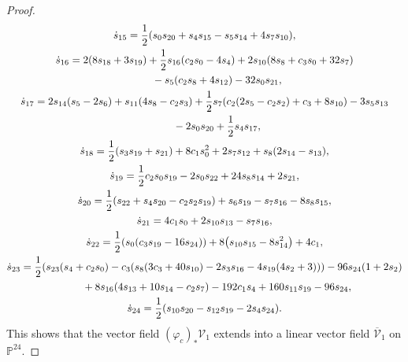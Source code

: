 \documentclass[10pt,a4paper]{amsart}
\numberwithin{equation}{section}
\begin{document}
\begin{proof}
\begin{gather*}
 \dot{s}_{15}= \frac{1}{2}(s_0s_{20}+s_4s_{15}-s_5s_{14}+4s_7s_{10}), \\
 \dot{s}_{16}= 2(8s_{18}+3s_{19})+\frac{1}{2}s_{16}(c_2s_0-4s_{4})+2s_{10}(8s_8+c_3s_0+32s_7) \\ \hphantom{\dot{s_{16}}=}{}
 -s_5(c_2s_8+4s_{12})-32s_0s_{21}, \\
 \dot{s}_{17}= 2s_{14}(s_{5}-2s_{6})+s_{11}(4s_{8}-c_2s_{3})+\frac{1}{2}s_{7}(c_2(2s_5-c_2s_2)+c_3+8s_{10})-3s_5s_{13} \\ \hphantom{\dot{s_{17}}=}{}
-2s_0s_{20}+\frac{1}{2}s_4s_{17} , \\
 \dot{s}_{18}= \frac{1}{2}(s_3s_{19}+s_{21})+8c_1s_0^2+2s_7s_{12}+s_8(2s_{14}-s_{13}), \\
 \dot{s}_{19}= \frac{1}{2}c_2s_0s_{19}-2s_0s_{22}+24s_8s_{14}+2s_{21} , \\
 \dot{s}_{20}= \frac{1}{2}(s_{22}+s_4s_{20}-c_2s_2s_{19})+s_6s_{19}-s_7s_{16}-8s_8s_{15}, \\
 \dot{s}_{21}= 4c_1s_0+2s_{10}s_{13}-s_7s_{16}, \\
 \dot{s}_{22}= \frac{1}{2}(s_0(c_3s_{19}-16s_{24}))+8\bigl(s_{10}s_{15}-8s_{14}^2\bigr)+4c_1, \\
 \dot{s}_{23}= \frac{1}{2}(s_{23}(s_4+c_2s_0)-c_3(s_{8}(3c_3+40s_{10})-2s_3s_{16}-4s_{19}(4s_2+3)))-96s_{24}(1+2s_2) \\ \hphantom{\dot{s_{23}}=}{}
 +8s_{16}(4s_{13}+10s_{14}-c_2s_7)-192c_1s_4+160s_{11}s_{19}-96s_{24}, \\
 \dot{s}_{24}= \frac{1}{2}(s_{10}s_{20}-s_{12}s_{19}-2s_4s_{24}).
\end{gather*}
This shows that the vector field
$(\varphi_c)_{\ast}\mathcal{V}_1$ extends into a linear
vector field $\overline{\mathcal{V}}_1$ on $\mathbb{P}^{24}$.
\end{proof}
\end{document}
